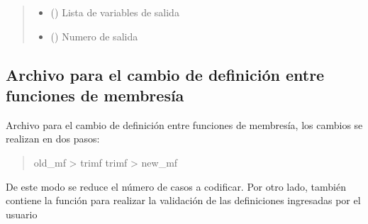 \documentclass[letterpaper,10pt,spanish]{sphinxmanual}
\begin{document}
\begin{fulllineitems}
\begin{fulllineitems}
\begin{quote}
\begin{description}
\begin{itemize}
\item {} 
 () \textendash{} Lista de variables de salida

\item {} 
 () \textendash{} Numero de salida

\end{itemize}

\end{description}\end{quote}

\end{fulllineitems}


\end{fulllineitems}



\subsection{Archivo para el cambio de definición entre funciones de membresía}
\label{\detokenize{codigos/modificadorMF:archivo-para-el-cambio-de-definicion-entre-funciones-de-membresia}}\label{\detokenize{codigos/modificadorMF::doc}}\label{\detokenize{codigos/modificadorMF:module-modificadorMf}}
Archivo para el cambio de definición entre funciones de membresía, los cambios se realizan en dos pasos:
\begin{quote}

old\_mf  \sphinxhyphen{}\textgreater{}  trimf
trimf   \sphinxhyphen{}\textgreater{}  new\_mf
\end{quote}

De este modo se reduce el número de casos a codificar. Por otro lado, también contiene la función para realizar la validación de las definiciones ingresadas por el usuario
\end{document}
